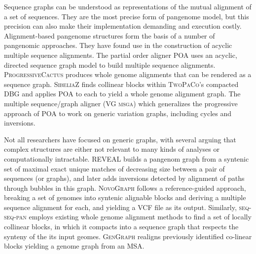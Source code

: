 Sequence graphs \cite{hein1989new} can be understood as representations of the mutual alignment of a set of sequences.
They are the most precise form of pangenome model, but this precision can also make their implementation demanding and execution costly.
Alignment-based pangenome structures form the basis of a number of pangenomic approaches.
They have found use in the construction of acyclic multiple sequence alignments.
The partial order aligner \textsc{POA} \cite{Lee_2002,Grasso_2004} uses an acyclic, directed sequence graph model to build multiple sequence alignments.
\textsc{ProgressiveCactus} \cite{Paten_2011} produces whole genome alignments that can be rendered as a sequence graph.
\textsc{SibeliaZ} \cite{Minkin_2019} finds collinear blocks within \textsc{TwoPaCo}'s compacted DBG and applies \textsc{POA} to each to yield a whole genome alignment graph.
The multiple sequence/graph aligner (\textsc{VG msga}) \cite{Novak_2017a,Garrison_2018,Garrison_2019} which generalizes the progressive approach of \textsc{POA} to work on generic variation graphs, including cycles and inversions.

Not all researchers have focused on generic graphs, with several arguing that complex structures are either not relevant to many kinds of analyses or computationally intractable. %
\textsc{REVEAL} \cite{linthorst2015scalable} builds a pangenom graph from a syntenic set of maximal exact unique matches of decreasing size between a pair of sequences (or graphs), and later adds inversions detected by alignment of paths through bubbles in this graph.
\textsc{NovoGraph} \cite{Biederstedt2018} follows a reference-guided approach, breaking a set of genomes into syntenic alignable blocks and deriving a multiple sequence alignment for each, and yielding a VCF file as its output.
Similarly, \textsc{seq-seq-pan} \cite{Jandrasits_2018} employs existing whole genome alignment methods to find a set of locally collinear blocks, in which it compacts into a sequence graph that respects the synteny of the its input geomes.
\textsc{GenGraph} \cite{Ambler_2019} realigns previously identified co-linear blocks yielding a genome graph from an MSA.

